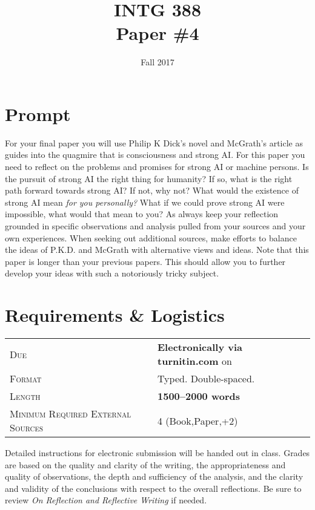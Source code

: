 \documentclass[]{tufte-handout}
\title{INTG 388 \\ Paper \#4 }
\date{ Fall 2017 }
\begin{document}
\maketitle

\section{Prompt}

For your final paper you will use Philip K Dick's novel\citep{dick_androids_2008} and McGrath's article\citep{mcgrath_religion_2011} as guides into the quagmire that is consciousness and strong AI\@. For this paper you need to reflect on the problems and promises for strong AI or machine persons. Is the pursuit of strong AI the right thing for humanity? If so, what is the right path forward towards strong AI\@? If not, why not? What would the existence of strong AI mean \textit{for you personally?} What if we could prove strong AI were impossible, what would that mean to you? As always keep your reflection grounded in specific observations and analysis pulled from your sources and your own experiences. When seeking out additional sources, make efforts to balance the ideas of P.K.D. and McGrath with alternative views and ideas. Note that this paper is longer than your previous papers. This should allow you to further develop your ideas with such a notoriously tricky subject.

\section{Requirements \& Logistics}

\begin{tabular}{ll}
\textsc{Due} & \textbf{Electronically via turnitin.com} on   \\
\textsc{Format} & Typed. Double-spaced. \\
\textsc{Length} & \textbf{1500--2000 words} \\
\textsc{Minimum Required External Sources} & 4 (Book,Paper,+2)
\end{tabular}


\vspace{.1in}

Detailed instructions for electronic submission will be handed out in class. Grades are based on the quality and clarity of the writing, the appropriateness and quality of observations, the depth and sufficiency of the analysis, and the clarity and validity of the conclusions with respect to the overall reflections. Be sure to review \textit{On Reflection and Reflective Writing} if needed.
\end{document}
